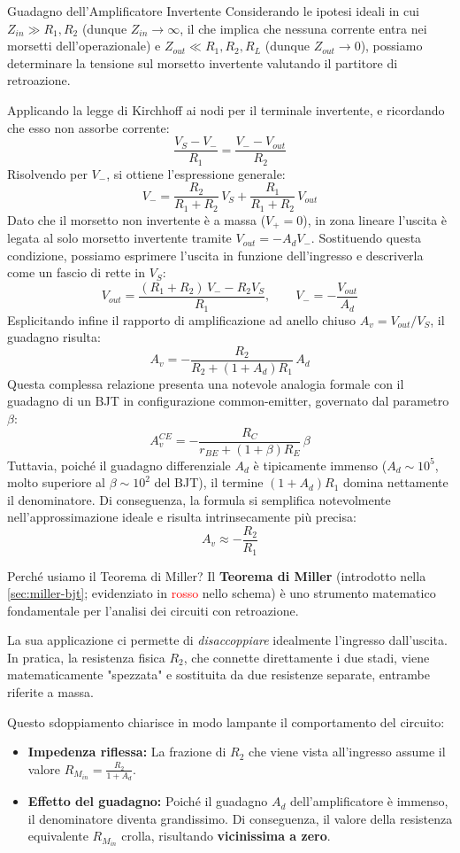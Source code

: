\begin{teorema}{Guadagno dell'Amplificatore Invertente}
Considerando le ipotesi ideali in cui $Z_{in} \gg R_1, R_2$ (dunque $Z_{in} \to \infty$, il che implica che nessuna corrente entra nei morsetti dell'operazionale) e $Z_{out} \ll R_1, R_2, R_L$ (dunque $Z_{out} \to 0$), possiamo determinare la tensione sul morsetto invertente valutando il partitore di retroazione.

Applicando la legge di Kirchhoff ai nodi per il terminale invertente, e ricordando che esso non assorbe corrente:
\[
    \frac{V_S - V_-}{R_1} = \frac{V_- - V_{out}}{R_2}
\]
Risolvendo per $V_-$, si ottiene l'espressione generale:
\[
    V_- = \frac{R_2}{R_1+R_2}\,V_S + \frac{R_1}{R_1+R_2}\,V_{out}
\]
Dato che il morsetto non invertente è a massa ($V_+ = 0$), in zona lineare l'uscita è legata al solo morsetto invertente tramite $V_{out} = -A_d V_-$. Sostituendo questa condizione, possiamo esprimere l'uscita in funzione dell'ingresso e descriverla come un fascio di rette in $V_S$:
\[
    V_{out} = \frac{(R_1+R_2)\,V_- - R_2 V_S}{R_1}, \qquad V_- = -\frac{V_{out}}{A_d}
\]
Esplicitando infine il rapporto di amplificazione ad anello chiuso $A_v = V_{out}/V_S$, il guadagno risulta:
\[
    \boxed{A_v = -\frac{R_2}{R_2 + (1+A_d)R_1}\,A_d}
\]
Questa complessa relazione presenta una notevole analogia formale con il guadagno di un BJT in configurazione common-emitter, governato dal parametro $\beta$:
\[
    A_v^{CE} = -\frac{R_C}{r_{BE}+(1+\beta)R_E}\,\beta
\]
Tuttavia, poiché il guadagno differenziale $A_d$ è tipicamente immenso ($A_d \sim 10^5$, molto superiore al $\beta \sim 10^2$ del BJT), il termine $(1+A_d)R_1$ domina nettamente il denominatore. Di conseguenza, la formula si semplifica notevolmente nell'approssimazione ideale e risulta intrinsecamente più precisa:
\[
    \boxed{A_v \approx -\frac{R_2}{R_1}}
\]

\begin{osservazione}{Perché usiamo il Teorema di Miller?}
    Il \textbf{Teorema di Miller} (introdotto nella \cref{sec:miller-bjt}; evidenziato in \textcolor{red}{rosso} nello schema) è uno strumento matematico fondamentale per l'analisi dei circuiti con retroazione.
    
    La sua applicazione ci permette di \textit{disaccoppiare} idealmente l'ingresso dall'uscita. In pratica, la resistenza fisica $R_2$, che connette direttamente i due stadi, viene matematicamente "spezzata" e sostituita da due resistenze separate, entrambe riferite a massa.
    
    Questo sdoppiamento chiarisce in modo lampante il comportamento del circuito:
    \begin{itemize}
        \item \textbf{Impedenza riflessa:} La frazione di $R_2$ che viene vista all'ingresso assume il valore $R_{M_{in}} = \frac{R_2}{1+A_d}$.
        \item \textbf{Effetto del guadagno:} Poiché il guadagno $A_d$ dell'amplificatore è immenso, il denominatore diventa grandissimo. Di conseguenza, il valore della resistenza equivalente $R_{M_{in}}$ crolla, risultando \textbf{vicinissima a zero}.
    \end{itemize}
    

\end{osservazione}
\end{teorema}
